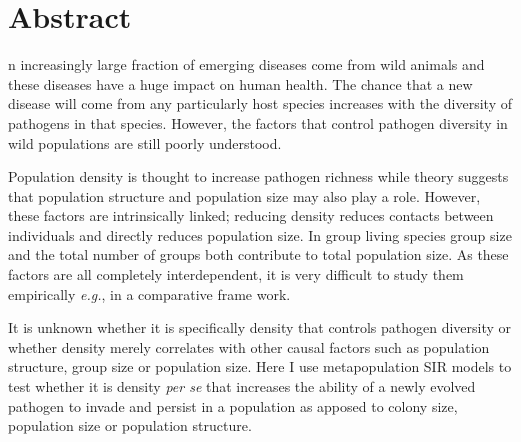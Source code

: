 










\section{Abstract}

n increasingly large fraction of emerging diseases come from wild animals and these diseases have a huge impact on human health.
The chance that a new disease will come from any particularly host species increases with the diversity of pathogens in that species.
However, the factors that control pathogen diversity in wild populations are still poorly understood.



Population density is thought to increase pathogen richness while theory suggests that population structure and population size may also play a role.
However, these factors are intrinsically linked; reducing density reduces contacts between individuals and directly reduces population size.
In group living species group size and the total number of groups both contribute to total population size. 
As these factors are all completely interdependent, it is very difficult to study them empirically \emph{e.g.}, in a comparative frame work.



It is unknown whether it is specifically density that controls pathogen diversity or whether density merely correlates with other causal factors such as population structure, group size or population size.
Here I use metapopulation SIR models to test whether it is density \emph{per se} that increases the ability of a newly evolved pathogen to invade and persist in a population as apposed to colony size, population size or population structure.


